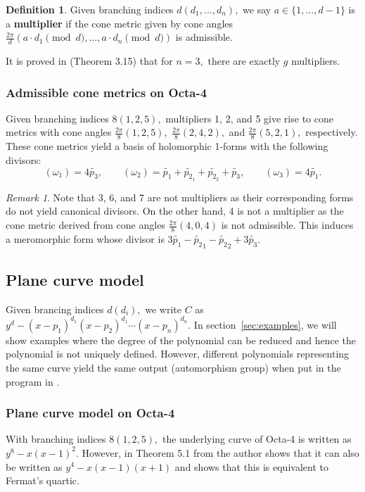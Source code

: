 \documentclass[12pt,reqno]{amsart}
\theoremstyle{definition}
\newtheorem{defn}{Definition}
\theoremstyle{remark}
\newtheorem*{remark}{Remark}
\begin{document}
\begin{defn} Given branching indices $d (d_1, \ldots , d_n),$ we say $a \in \{1, \ldots, d - 1\}$ is a \textbf{multiplier} if the cone metric given by cone angles $\frac{2 \pi}{d} (a \cdot d_1 \pmod d, \ldots , a \cdot d_n \pmod d)$ is admissible. 
\end{defn}

It is proved in \cite{dthesis} (Theorem 3.15) that for $n = 3,$ there are exactly $g$ multipliers. 

\subsubsection*{Admissible cone metrics on Octa-4} Given branching indices $8 (1, 2, 5),$ multipliers 1, 2, and 5 give rise to cone metrics with cone angles $\frac{2 \pi}{8}(1, 2, 5),$ $\frac{2 \pi}{8}(2, 4, 2),$ and $\frac{2 \pi}{8}(5, 2, 1),$ respectively. These cone metrics yield a basis of holomorphic 1-forms with the following divisors: $$(\omega_1) = 4 \widetilde{p_3}, \qquad (\omega_2) = \widetilde{p_1} + \widetilde{p_{2_1}} + \widetilde{p_{2_2}} + \widetilde{p_3}, \qquad (\omega_3) = 4 \widetilde{p_1}.$$

\begin{remark} Note that 3, 6, and 7 are not multipliers as their corresponding forms do not yield canonical divisors. On the other hand, 4 is not a multiplier as the cone metric derived from cone angles $\frac{2 \pi}{8} (4, 0, 4)$ is not admissible. This induces a meromorphic form whose divisor is $3 \widetilde{p_1} - \widetilde{p_2}_1 - \widetilde{p_2}_2 + 3 \widetilde{p_3}.$ \end{remark}

\subsection{Plane curve model}
\label{subsec:polynomial} Given brancing indices $d (d_i),$ we write $C$ as $y^d - (x - p_1)^{d_1} (x - p_2)^{d_1} \cdots (x - p_n)^{d_n}.$ In section~\ref{sec:examples}, we will show examples where the degree of the polynomial can be reduced and hence the polynomial is not uniquely defined. However, different polynomials representing the same curve yield the same output (automorphism group) when put in the program in \cite{jeroen}.


\subsubsection*{Plane curve model on Octa-4}
With branching indices $8 (1, 2, 5),$ the underlying curve of Octa-4 is written as $y^8 - x (x-1)^2.$ However, in Theorem 5.1 from \cite{dami} the author shows that it can also be written as $y^4 - x (x-1) (x+1)$ and shows that this is equivalent to Fermat's quartic.
\end{document}
